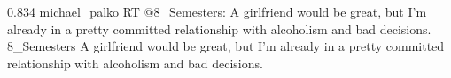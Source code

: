 %
%
%
%
{0.834}
{\joinNameTweet
{michael\_palko}
{RT @8\_Semesters: A girlfriend would be great, but I'm already in a pretty committed relationship with alcoholism and bad decisions.}}
{\joinNameTweet
{8\_Semesters}
{A girlfriend would be great, but I'm already in a pretty committed relationship with alcoholism and bad decisions.}}
%
%
